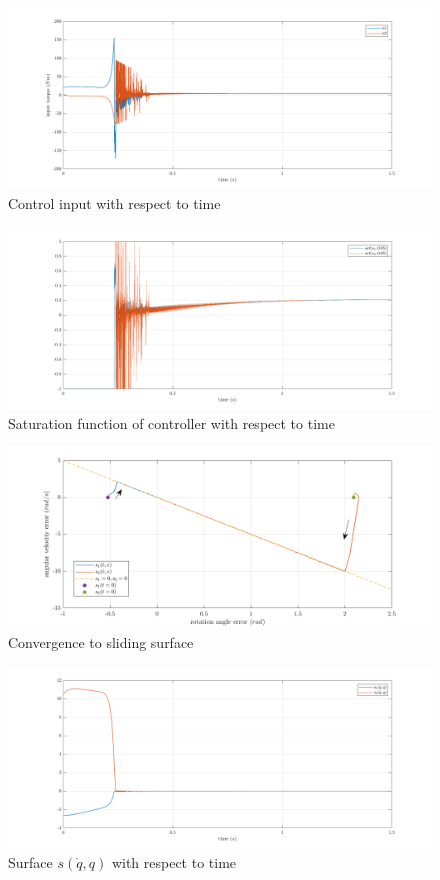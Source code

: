 \documentclass[a4paper]{article}
\begin{document}
\begin{figure}[H]
    \centering
    \includegraphics[width=15cm]{fig/sim1/u.png}
    \caption{Control input with respect to time}
\end{figure}
\begin{figure}[H]
    \centering
    \includegraphics[width=15cm]{fig/sim1/sat.png}
    \caption{Saturation function of controller with respect to time}
\end{figure}
\begin{figure}[H]
    \centering
    \includegraphics[width=15cm]{fig/sim1/sliding.png}
    \caption{Convergence to sliding surface}
\end{figure}
\begin{figure}[H]
    \centering
    \includegraphics[width=15cm]{fig/sim1/s.png}
    \caption{Surface $s(\dot{q}, q)$ with respect to time}
\end{figure}
\end{document}

